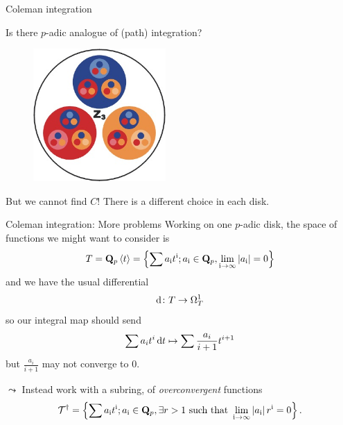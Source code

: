 \begin{frame}{Coleman integration}
    \begin{question}
        Is there $p$-adic analogue of (path) integration?
\end{question}


\begin{figure}
{
    \includegraphics[width=0.45\textwidth]{padic.jpg}
}
\caption*{}
\end{figure}




{
    But we cannot find $C$! There is a different choice in each disk.
}

\end{frame}

\begin{frame}{Coleman integration: More problems}
    Working on one  $p$-adic disk, the space of functions we might want to consider is
    \[T = \mathbf Q_p\left\langle t\right\rangle=\left\{\sum a_{\mathrm{i}} t^{\mathrm{i}} ; a_{\mathrm{i}} \in \mathbf Q_p, \lim _{\mathrm{i} \rightarrow \infty}\left|a_{\mathrm{i}}\right|=0\right\}\]
    and we have the usual differential
    \[\mathop{}\!\mathrm{d} \colon T \to \Omega ^1_{T}\]
    so our integral map should send
    \[ \sum a_{i} t^{i} \mathop{}\!\mathrm{d} t\mapsto\sum \frac{a_{i}}{i+1} t^{i+1} \]\pause
    but \(\frac{a_i}{i+1}\) may not converge to 0.  \pause

    $\leadsto$ Instead work with a subring, of \emph{overconvergent} functions
    \[\mathcal{T}^{\dagger}=\left\{\sum a_{\mathrm{i}} t^{\mathrm{i}} ; a_{\mathrm{i}} \in \mathbf Q_p, \exists r>1 \text { such that } \lim _{\mathrm{i} \rightarrow \infty}\left|a_{\mathrm{i}}\right| r^{\mathrm{i}}=0\right\}\text.\]

\end{frame}


